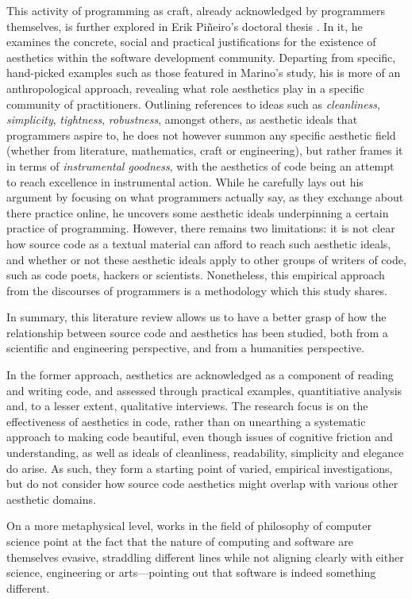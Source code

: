 This activity of programming as craft, already acknowledged by programmers themselves, is further explored in Erik Piñeiro's doctoral thesis \citep{pineiro_aesthetics_2003}. In it, he examines the concrete, social and practical justifications for the existence of aesthetics within the software development community. Departing from specific, hand-picked examples such as those featured in Marino's study, his is more of an anthropological approach, revealing what role aesthetics play in a specific community of practitioners. Outlining references to ideas such as \emph{cleanliness}, \emph{simplicity}, \emph{tightness}, \emph{robustness}, amongst others, as aesthetic ideals that programmers aspire to, he does not however summon any specific aesthetic field (whether from literature, mathematics, craft or engineering), but rather frames it in terms of \emph{instrumental goodness}, with the aesthetics of code being an attempt to reach excellence in instrumental action. While he carefully lays out his argument by focusing on what programmers actually say, as they exchange about there practice online, he uncovers some aesthetic ideals underpinning a certain practice of programming. However, there remains two limitations: it is not clear how source code as a textual material can afford to reach such aesthetic ideals, and whether or not these aesthetic ideals apply to other groups of writers of code, such as code poets, hackers or scientists. Nonetheless, this empirical approach from the discourses of programmers is a methodology which this study shares.

In summary, this literature review allows us to have a better grasp of how the relationship between source code and aesthetics has been studied, both from a scientific and engineering perspective, and from a humanities perspective.

In the former approach, aesthetics are acknowledged as a component of reading and writing code, and assessed through practical examples, quantitiative analysis and, to a lesser extent, qualitative interviews. The research focus is on the effectiveness of aesthetics in code, rather than on unearthing a systematic approach to making code beautiful, even though issues of cognitive friction and understanding, as well as ideals of cleanliness, readability, simplicity and elegance do arise. As such, they form a starting point of varied, empirical investigations, but do not consider how source code aesthetics might overlap with various other aesthetic domains.

On a more metaphysical level, works in the field of philosophy of computer science point at the fact that the nature of computing and software are themselves evasive, straddling different lines while not aligning clearly with either science, engineering or arts—pointing out that software is indeed something different.

